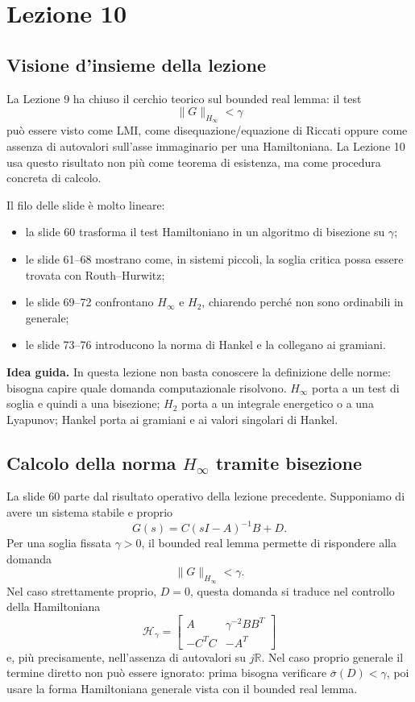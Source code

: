 \documentclass[11pt,a4paper]{article}
\begin{document}
\section{Lezione 10}

\subsection{Visione d'insieme della lezione}

La Lezione 9 ha chiuso il cerchio teorico sul bounded real lemma: il test
$$
\|G\|_{H_\infty}<\gamma
$$
pu\`o essere visto come LMI, come disequazione/equazione di Riccati oppure come assenza di autovalori sull'asse immaginario per una Hamiltoniana. La Lezione 10 usa questo risultato non pi\`u come teorema di esistenza, ma come procedura concreta di calcolo.

Il filo delle slide \`e molto lineare:
\begin{itemize}
    \item la slide 60 trasforma il test Hamiltoniano in un algoritmo di bisezione su $\gamma$;
    \item le slide 61--68 mostrano come, in sistemi piccoli, la soglia critica possa essere trovata con Routh--Hurwitz;
    \item le slide 69--72 confrontano $H_\infty$ e $H_2$, chiarendo perch\'e non sono ordinabili in generale;
    \item le slide 73--76 introducono la norma di Hankel e la collegano ai gramiani.
\end{itemize}

\begin{keybox}
\textbf{Idea guida.} In questa lezione non basta conoscere la definizione delle norme: bisogna capire quale domanda computazionale risolvono. $H_\infty$ porta a un test di soglia e quindi a una bisezione; $H_2$ porta a un integrale energetico o a una Lyapunov; Hankel porta ai gramiani e ai valori singolari di Hankel.
\end{keybox}

\subsection{Calcolo della norma \texorpdfstring{$H_\infty$}{H-infinito} tramite bisezione}

La slide 60 parte dal risultato operativo della lezione precedente. Supponiamo di avere un sistema stabile e proprio
$$
G(s)=C(sI-A)^{-1}B+D.
$$
Per una soglia fissata $\gamma>0$, il bounded real lemma permette di rispondere alla domanda
$$
\|G\|_{H_\infty}<\gamma.
$$
Nel caso strettamente proprio, $D=0$, questa domanda si traduce nel controllo della Hamiltoniana
$$
\mathcal{H}_\gamma=
\begin{bmatrix}
A & \gamma^{-2}BB^T\\
-C^TC & -A^T
\end{bmatrix}
$$
e, pi\`u precisamente, nell'assenza di autovalori su $j\mathbb{R}$. Nel caso proprio generale il termine diretto non pu\`o essere ignorato: prima bisogna verificare $\bar{\sigma}(D)<\gamma$, poi usare la forma Hamiltoniana generale vista con il bounded real lemma.
\end{document}
